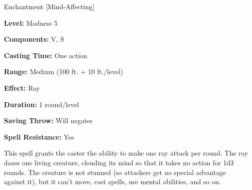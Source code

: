 
Enchantment [Mind-Affecting]

\textbf{Level:} Madness 5

\textbf{Components:} V, S

\textbf{Casting Time:} One action

\textbf{Range:} Medium (100 ft. + 10 ft./level)

\textbf{Effect:} Ray

\textbf{Duration:} 1 round/level

\textbf{Saving Throw:} Will negates

\textbf{Spell Resistance:} Yes

This spell grants the caster the ability to make one ray attack per round. The 
ray dazes one living creature, clouding its mind so that it takes no action for 
1d3 rounds. The creature is not stunned (so attackers get no special advantage 
against it), but it can't move, cast spells, use mental abilities, and so on.


